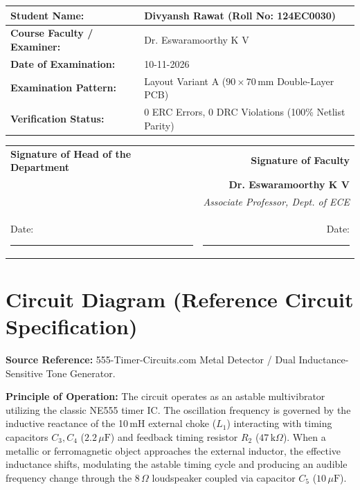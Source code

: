 \documentclass[11pt,a4paper]{article}
\begin{document}
\vspace{6mm}

\begin{table}[H]
\centering
\small
\renewcommand{\arraystretch}{1.3}
\begin{tabular}{|l|l|}
\hline
\textbf{Student Name:} & Divyansh Rawat (Roll No: 124EC0030) \\ \hline
\textbf{Course Faculty / Examiner:} & Dr. Eswaramoorthy K V \\ \hline
\textbf{Date of Examination:} & 10-11-2026 \\ \hline
\textbf{Examination Pattern:} & Layout Variant A ($90 \times 70$\,mm Double-Layer PCB) \\ \hline
\textbf{Verification Status:} & 0 ERC Errors, 0 DRC Violations (100\% Netlist Parity) \\ \hline
\end{tabular}
\end{table}

\vfill

\noindent
\begin{tabularx}{\textwidth}{X r}
\textbf{Signature of Head of the Department} & \textbf{Signature of Faculty} \\[25pt]
 & \textbf{Dr. Eswaramoorthy K V} \\[4pt]
 & \textit{Associate Professor, Dept. of ECE} \\[6pt]
Date: \rule{4cm}{0.4pt} & Date: \rule{4cm}{0.4pt} \\
\end{tabularx}

\clearpage

\section{Circuit Diagram (Reference Circuit Specification)}

\textbf{Source Reference:} 555-Timer-Circuits.com Metal Detector / Dual Inductance-Sensitive Tone Generator.

\textbf{Principle of Operation:} The circuit operates as an astable multivibrator utilizing the classic NE555 timer IC. The oscillation frequency is governed by the inductive reactance of the 10\,mH external choke ($L_1$) interacting with timing capacitors $C_3, C_4$ ($2.2\,\mu\text{F}$) and feedback timing resistor $R_2$ ($47\,\text{k}\Omega$). When a metallic or ferromagnetic object approaches the external inductor, the effective inductance shifts, modulating the astable timing cycle and producing an audible frequency change through the $8\,\Omega$ loudspeaker coupled via capacitor $C_5$ ($10\,\mu\text{F}$).
\end{document}
